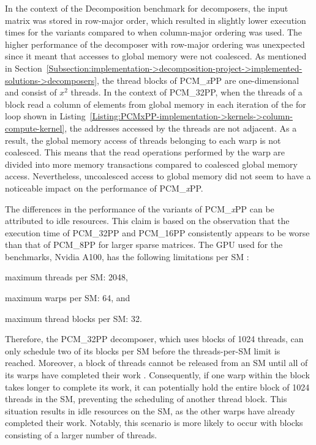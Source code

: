 In the context of the Decomposition benchmark for decomposers, the input matrix was stored in row-major order, which resulted in slightly lower execution times for the variants compared to when column-major ordering was used.
The higher performance of the decomposer with row-major ordering was unexpected since it meant that accesses to global memory were not coalesced.
As mentioned in Section~\ref{Subsection:implementation->decomposition-project->implemented-solutions->decomposers}, the thread blocks of PCM\_\textit{x}PP are one-dimensional and consist of $x^2$ threads.
In the context of PCM\_32PP, when the threads of a block read a column of elements from global memory in each iteration of the for loop shown in Listing~\ref{Listing:PCMxPP-implementation->kernels->column-compute-kernel}, the addresses accessed by the threads are not adjacent.
As a result, the global memory access of threads belonging to each warp is not coalesced.
This means that the read operations performed by the warp are divided into more memory transactions compared to coalesced global memory access.
Nevertheless, uncoalesced access to global memory did not seem to have a noticeable impact on the performance of PCM\_\textit{x}PP.

The differences in the performance of the variants of PCM\_\textit{x}PP can be attributed to idle resources.
This claim is based on the observation that the execution time of PCM\_32PP and PCM\_16PP consistently appears to be worse than that of PCM\_8PP for larger sparse matrices.
The GPU used for the benchmarks, Nvidia A100, has the following limitations per SM \cite{rfiOEXAGDlcAOxF3}:

\begin{tight_enumerate}
	\item maximum threads per SM: 2048,
	\item maximum warps per SM: 64, and
	\item maximum thread blocks per SM: 32.
\end{tight_enumerate}

Therefore, the PCM\_32PP decomposer, which uses blocks of 1024 threads, can only schedule two of its blocks per SM before the threads-per-SM limit is reached.
Moreover, a block of threads cannot be released from an SM until all of its warps have completed their work \cite{Cheng2014}.
Consequently, if one warp within the block takes longer to complete its work, it can potentially hold the entire block of 1024 threads in the SM, preventing the scheduling of another thread block.
This situation results in idle resources on the SM, as the other warps have already completed their work.
Notably, this scenario is more likely to occur with blocks consisting of a larger number of threads.

